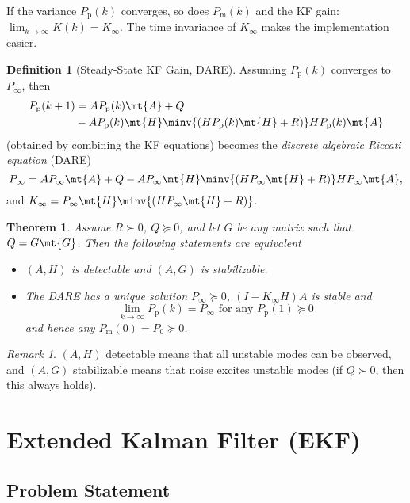 \documentclass[]{hsrzf}
\theoremstyle{plain}
\newtheorem{thm}{Theorem}[section]
\theoremstyle{definition}
\newtheorem{defn}{Definition}[section]
\theoremstyle{remark}
\newtheorem*{remark}{Remark}
\begin{document}
If the variance $P_\mathrm{p}(k)$ converges, so does $P_\mathrm{m}(k)$ and the
KF gain: $\lim_{k\to\infty} K(k) = K_\infty$. The time invariance of
$K_\infty$ makes the implementation easier.

\begin{defn}[Steady-State KF Gain, DARE]
  Assuming $P_\mathrm{p}(k)$ converges to $P_\infty$, then
  \begin{align*}
    P_\mathrm{p}(k+1) &= A P_\mathrm{p}(k) \mt{A} + Q \\
      &- A P_\mathrm{p}(k)
      \mt{H} \minv{( H P_\mathrm{p}(k) \mt{H} + R)} H P_\mathrm{p}(k) \mt{A}
  \end{align*}
  (obtained by combining the KF equations) becomes the \emph{discrete
  algebraic Riccati equation} (DARE)
  \[
    P_\infty = A P_\infty \mt{A} + Q - A P_\infty \mt{H}
      \minv{(H P_\infty \mt{H} + R)} H P_\infty \mt{A},
  \]
  and $K_\infty = P_\infty \mt{H}\minv{(H P_\infty \mt{H} + R)}$.
\end{defn}


\begin{thm}
  Assume $R \succ 0$, $Q \succeq 0$, and let $G$ be any matrix such that $Q =
  G\mt{G}$. Then the following statements are equivalent
  \begin{itemize}
    \item $(A, H)$ is detectable and $(A, G)$ is stabilizable.
    \item The DARE has a unique solution $P_\infty \succeq 0$, $(I - K_\infty
      H)A$ is stable and
      \[
        \lim_{k\to\infty} P_\mathrm{p}(k) = P_\infty
        \text{ for any } P_\mathrm{p}(1) \succeq 0
      \]
      and hence any $P_\mathrm{m}(0) = P_0 \succeq 0$.
  \end{itemize}
\end{thm}

\begin{remark}
  $(A,H)$ detectable means that all unstable modes can be observed, and
  $(A,G)$ stabilizable means that noise excites unstable modes (if $Q \succ 0$, then
  this always holds).
\end{remark}

\section{Extended Kalman Filter (EKF)}

\subsection{Problem Statement}
\end{document}
